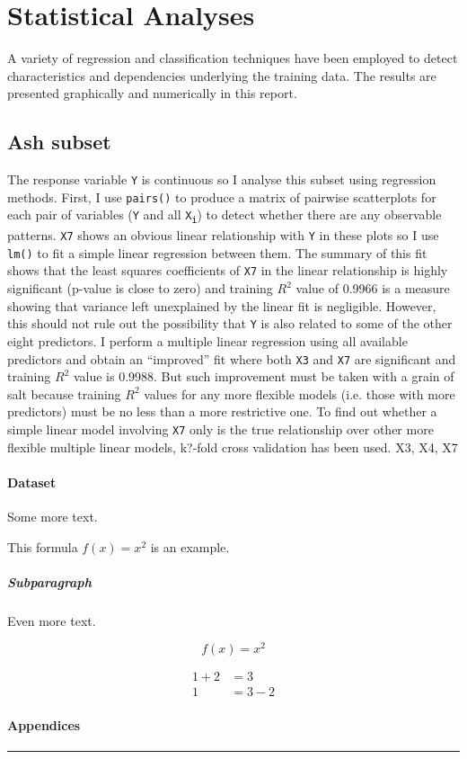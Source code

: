\documentclass{article}
\begin{document}
\section{Statistical Analyses}

A variety of regression and classification techniques have been employed to detect characteristics and dependencies underlying the training data. The results are presented graphically and numerically in this report.

\subsection{Ash subset}

The response variable {\tt Y} is continuous so I analyse this subset using regression methods. First, I use {\tt pairs()} to produce a matrix of pairwise scatterplots for each pair of variables ({\tt Y} and all {\tt X\textsubscript{i}}) to detect whether there are any observable patterns. {\tt X7} shows an obvious linear relationship with {\tt Y} in these plots so I use {\tt lm()} to fit a simple linear regression between them. The summary of this fit shows that the least squares coefficients of {\tt X7} in the linear relationship is highly significant (p-value is close to zero) and training $R^2$ value of 0.9966 is a measure showing that variance left unexplained by the linear fit is negligible. However, this should not rule out the possibility that {\tt Y} is also related to some of the other eight predictors. I perform a multiple linear regression using all available predictors and obtain an ``improved'' fit where both {\tt X3} and {\tt X7} are significant and training $R^2$ value is 0.9988. But such improvement must be taken with a grain of salt because training $R^2$ values for any more flexible models (i.e. those with more predictors) must be no less than a more restrictive one. To find out whether a simple linear model involving {\tt X7} only is the true relationship over other more flexible multiple linear models, k?-fold cross validation has been used.  X3, X4, X7

\paragraph{Dataset}

Some more text.

This formula $f(x) = x^2$ is an example.

\subparagraph{Subparagraph}

Even more text.

\begin{equation*}
  f(x) = x^2
\end{equation*}

\begin{align*}
  1 + 2 &= 3\\
  1 &= 3 - 2
\end{align*}
\newpage
\paragraph{Appendices}



\rule{\textwidth}{1pt}
\end{document}
